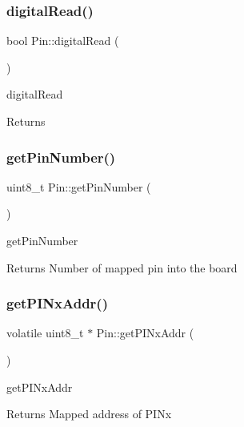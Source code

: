 \subsubsection{\texorpdfstring{digital\+Read()}{digitalRead()}}
{\footnotesize\ttfamily bool Pin\+::digital\+Read (\begin{DoxyParamCaption}{ }\end{DoxyParamCaption})}



digital\+Read 

\begin{DoxyReturn}{Returns}

\end{DoxyReturn}
\mbox{\label{classPin_aaad2c2cc8ccda03ffe9c07e12323cf4d}} 
\subsubsection{\texorpdfstring{get\+Pin\+Number()}{getPinNumber()}}
{\footnotesize\ttfamily uint8\+\_\+t Pin\+::get\+Pin\+Number (\begin{DoxyParamCaption}{ }\end{DoxyParamCaption})}



get\+Pin\+Number 

\begin{DoxyReturn}{Returns}
Number of mapped pin into the board 
\end{DoxyReturn}
\mbox{\label{classPin_ae2d4f832b081cd2d188151a0c4589f8d}} 
\subsubsection{\texorpdfstring{get\+P\+I\+Nx\+Addr()}{getPINxAddr()}}
{\footnotesize\ttfamily volatile uint8\+\_\+t $\ast$ Pin\+::get\+P\+I\+Nx\+Addr (\begin{DoxyParamCaption}{ }\end{DoxyParamCaption})}



get\+P\+I\+Nx\+Addr 

\begin{DoxyReturn}{Returns}
Mapped address of P\+I\+Nx 
\end{DoxyReturn}
\mbox{\label{classPin_a5a9c1d0f1937b7083779ca4afba2a607}} 
